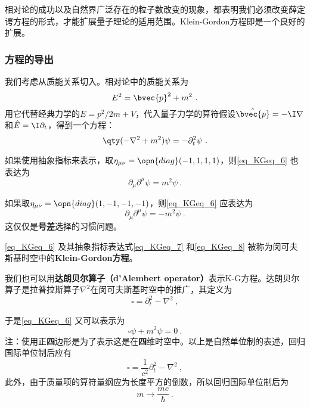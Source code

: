 相对论的成功以及自然界广泛存在的粒子数改变的现象，都表明我们必须改变薛定谔方程的形式，才能扩展量子理论的适用范围。Klein-Gordon方程即是一个良好的扩展。

\subsubsection{方程的导出}

我们考虑从质能关系切入。相对论中的质能关系为
\begin{equation}
E^2=\bvec{p}^2+m^2~.
\end{equation}
用它代替经典力学的$E=p^2/2m+V$，代入量子力学的算符假设$\hat{\bvec{p}}=-\I\nabla$和$\hat{E}=\I\partial_t$，得到一个方程：
\begin{equation}\label{eq_KGeq_6}
\qty(-\nabla^2+m^2)\psi = -\partial_t^2 \psi~.
\end{equation}

如果使用抽象指标来表示，取$\eta_{\mu\nu}=\opn{diag}(-1, 1, 1, 1)$，则\autoref{eq_KGeq_6} 也表达为
\begin{equation}\label{eq_KGeq_7}
\partial_\mu\partial^\mu \psi = m^2\psi~.
\end{equation}

如果取$\eta_{\mu\nu}=\opn{diag}(1, -1, -1, -1)$，则\autoref{eq_KGeq_6} 应表达为
\begin{equation}\label{eq_KGeq_8}
\partial_\mu\partial^\mu \psi = -m^2\psi~.
\end{equation}
这仅仅是\textbf{号差}选择的习惯问题。

\autoref{eq_KGeq_6} 及其抽象指标表达式\autoref{eq_KGeq_7} 和\autoref{eq_KGeq_8} 被称为闵可夫斯基时空中的\textbf{Klein-Gordon方程}。

我们也可以用\textbf{达朗贝尔算子（d'Alembert operator）}表示K-G方程。达朗贝尔算子是拉普拉斯算子$\nabla^2$在闵可夫斯基时空中的推广，其定义为
\begin{equation}
\square = \partial_t^2-\nabla^2~,
\end{equation}


于是\autoref{eq_KGeq_6} 又可以表示为
\begin{equation}
\square \psi + m^2\psi = 0~.
\end{equation}
注：使用正\textbf{四}边形是为了表示这是在\textbf{四}维时空中。以上是自然单位制的表述，回归国际单位制后应有
\begin{equation}
\square = \frac{1}{c^2}\partial_t^2-\nabla^2~,
\end{equation}
此外，由于质量项的算符量纲应为长度平方的倒数，所以回归国际单位制后为
\begin{equation}
m\rightarrow \frac{mc}{\hbar}~.
\end{equation}


